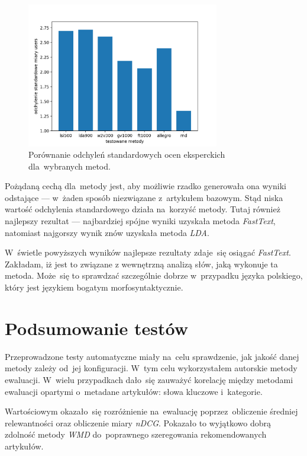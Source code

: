 \documentclass[pl]{minipw} %
\begin{document}
\begin{figure}[H]
	\centering
	\includegraphics[width=0.75\textwidth]{img/results/lsi500_lda900_w2v300_gv1000_ft1000_allegro_rnd_users_std.png}
	\caption{Porównanie odchyleń standardowych ocen eksperckich dla~wybranych metod.}
\end{figure}

Pożądaną cechą dla~metody jest, aby możliwie rzadko generowała ona wyniki odstające --- w~żaden sposób niezwiązane z~artykułem bazowym. Stąd niska wartość odchylenia standardowego działa na~korzyść metody. Tutaj również najlepszy rezultat --- najbardziej spójne wyniki uzyskała metoda \textit{FastText}, natomiast najgorszy wynik znów uzyskała metoda \textit{LDA}.

W~świetle powyższych wyników najlepsze rezultaty zdaje~się osiągać \textit{FastText}. Zakładam, iż jest to związane z wewnętrzną analizą słów, jaką wykonuje ta metoda. Może~się to sprawdzać szczególnie dobrze w~przypadku języka polskiego, który jest językiem bogatym morfosyntaktycznie.

\section{Podsumowanie testów}

Przeprowadzone testy automatyczne miały na~celu sprawdzenie, jak jakość danej metody zależy od~jej konfiguracji. W~tym celu wykorzystałem autorskie metody ewaluacji. W~wielu przypadkach dało~się zauważyć korelację między metodami ewaluacji opartymi o~metadane artykułów: słowa kluczowe i~kategorie.

Wartościowym okazało~się rozróżnienie na~ewaluację poprzez~obliczenie średniej relewantności oraz obliczenie miary \textit{nDCG}. Pokazało to wyjątkowo dobrą zdolność metody \textit{WMD} do~poprawnego szeregowania rekomendowanych artykułów.
\end{document}

